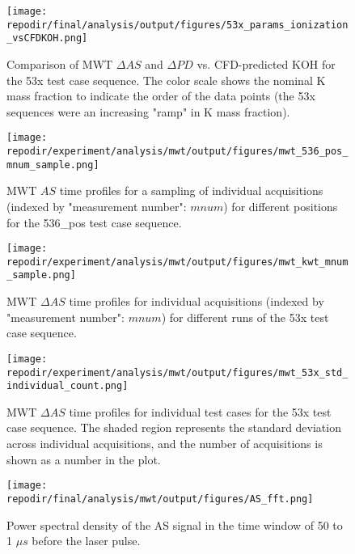 \begin{figure}[h]
    \centering
    \texttt{[image: \\repodir/final/analysis/output/figures/53x\_params\_ionization\_vsCFDKOH.png]} 
    \caption{Comparison of MWT $\Delta AS$ and $\Delta PD$ vs. CFD-predicted KOH for the 53x test case sequence. The color scale shows the nominal K mass fraction to indicate the order of the data points (the 53x sequences were an increasing "ramp" in K mass fraction).}
    \label{fig:SI_53x_params_ionization_vsCFDKOH}
\end{figure}



\begin{figure}[]
\centering
\texttt{[image: \\repodir/experiment/analysis/mwt/output/figures/mwt\_536\_pos\_mnum\_sample.png]}
\caption{MWT $AS$ time profiles for a sampling of individual acquisitions (indexed by "measurement number": $mnum$) for different positions for the 536\_pos test case sequence.}
\label{fig:SI_mwt_536_pos_mnum_sample}
\end{figure}

\begin{figure}
    \centering
    \texttt{[image: \\repodir/experiment/analysis/mwt/output/figures/mwt\_kwt\_mnum\_sample.png]} 
    \caption{MWT $\Delta AS$ time profiles for individual acquisitions (indexed by "measurement number": $mnum$) for different runs of the 53x test case sequence.  }
    \label{fig:SI_mwt_kwt_mnum_sample}
\end{figure}

\begin{figure}
    \centering
    \texttt{[image: \\repodir/experiment/analysis/mwt/output/figures/mwt\_53x\_std\_individual\_count.png]} 
    \caption{MWT $\Delta AS$ time profiles for individual test cases for the 53x test case sequence. The shaded region represents the standard deviation across individual acquisitions, and the number of acquisitions is shown as a number in the plot.}
    \label{fig:SI_mwt_53x_std_individual_count}
\end{figure}

\begin{figure}
    \centering
    \texttt{[image: \\repodir/final/analysis/mwt/output/figures/AS\_fft.png]} 
    \caption{Power spectral density of the AS signal in the time window of 50 to 1 $\mu s$ before the laser pulse.}
    \label{fig:SI_AS_fft}
\end{figure}


